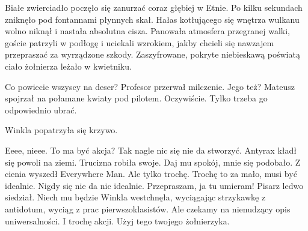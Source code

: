Białe zwierciadło poczęło się zanurzać coraz głębiej w Etnie.
Po kilku sekundach zniknęło pod fontannami płynnych skał.
Hałas kotłującego się wnętrza wulkanu wolno niknął i nastała absolutna cisza.
Panowała atmosfera przegranej walki, goście patrzyli w podłogę i uciekali wzrokiem, jakby chcieli się nawzajem przepraszać za wyrządzone szkody.
Zaszyfrowane, pokryte niebieskawą poświatą ciało żołnierza leżało w kwietniku.

\begin{dialogue}
\ds{} Co powiecie wszyscy na deser? \dm{} Profesor przerwał milczenie.
\ds{} Jego też? \dm{} Mateusz spojrzał na połamane kwiaty pod pilotem.
\ds{} Oczywiście. Tylko trzeba go odpowiednio ubrać.
\end{dialogue}

\divider{}

Winkla popatrzyła się krzywo.
\begin{dialogue}
\ds{} Eeee, nieee. To ma być akcja? 
\ds{} Tak nagle nic się nie da stworzyć. \dm{} Antyrax kładł się powoli na ziemi. Trucizna robiła swoje.
\ds{} Daj mu spokój, mnie się podobało. \dm{} Z cienia wyszedł Everywhere Man. \dm{} Ale tylko trochę.
\ds{} Trochę to za mało, musi być idealnie.
\ds{} Nigdy się nie da nic idealnie.
\ds{} Przepraszam, ja tu umieram! \dm{} Pisarz ledwo siedział.
\ds{} Niech mu będzie \dm{} Winkla westchnęła, wyciągając strzykawkę z antidotum, wyciąg z prac pierwszoklasistów. \dm{} Ale czekamy na nienudzący opis uniwersalności.
\ds{} I trochę akcji. Użyj tego twojego żołnierzyka.
\end{dialogue}

\divider{}

